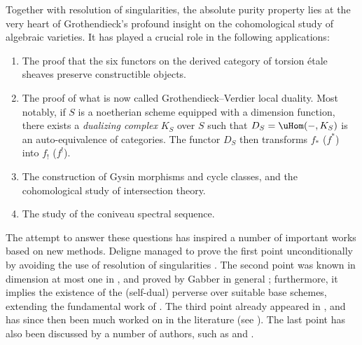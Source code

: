 Together with resolution of singularities, the absolute purity property lies at the very heart of Grothendieck's profound insight on the cohomological study of algebraic varieties. It has played a crucial role in the following applications:
\begin{enumerate}
\item The proof that the six functors on the derived category of torsion étale sheaves preserve constructible objects.

\item The proof of what is now called Grothendieck--Verdier local duality. Most notably, if $S$ is a noetherian scheme equipped with a dimension function, there exists a \emph{dualizing complex} $K_S$ over $S$ such that $D_S=\uHom(-,K_S)$ is an auto-equivalence of categories. The functor $D_S$ then transforms $f_*$ (\resp $f^*$) into $f_!$ (\resp $f^!$).

\item The construction of Gysin morphisms and cycle classes, and the cohomological study of intersection theory.

\item The study of the coniveau spectral sequence.
\end{enumerate}
The attempt to answer these questions has inspired a number of important works based on new methods. Deligne managed to prove the first point unconditionally by avoiding the use of resolution of singularities \cite[Th.\,Finitude]{SGA4.5}. The second point was known in dimension at most one in \cite[Dualité\,1.4]{SGA4.5}, and proved by Gabber in general \cite[XVII]{Gabber}; furthermore, it implies the existence of the (self-dual) perverse \tstructure over suitable base schemes, extending the fundamental work of \cite{BBD}.
The third point already appeared in \cite[XVIII]{SGA4}, and has since then been much worked on in the literature (see \cite{DJK}). The last point has also been discussed by a number of authors, such as \cite{BlochOgus} and \cite{CTHK}.

